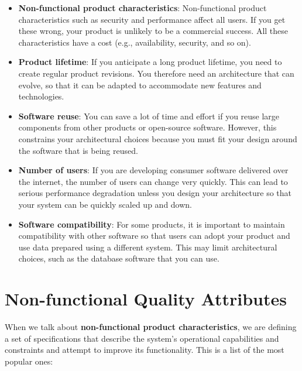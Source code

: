 \begin{itemize}
    \item \textbf{Non-functional product characteristics}: Non-functional product characteristics such as security and performance affect all users. If you get these wrong, your product is unlikely to be a commercial success. All these characteristics have a cost (e.g., availability, security, and so on).
    \item \textbf{Product lifetime}: If you anticipate a long product lifetime, you need to create regular product revisions. You therefore need an architecture that can evolve, so that it can be adapted to accommodate new features and technologies.
    \item \textbf{Software reuse}: You can save a lot of time and effort if you reuse large components from other products or open-source software. However, this constrains your architectural choices because you must fit your design around the software that is being reused.
    \item \textbf{Number of users}: If you are developing consumer software delivered over the internet, the number of users can change very quickly. This can lead to serious performance degradation unless you design your architecture so that your system can be quickly scaled up and down.
    \item \textbf{Software compatibility}: For some products, it is important to maintain compatibility with other software so that users can adopt your product and use data prepared using a different system. This may limit architectural choices, such as the database software that you can use.
\end{itemize}

\section{Non-functional Quality Attributes}

When we talk about \textbf{non-functional product characteristics}, we are defining a set of specifications that describe the system’s operational capabilities and constraints and attempt to improve its functionality. This is a list of the most popular ones:

